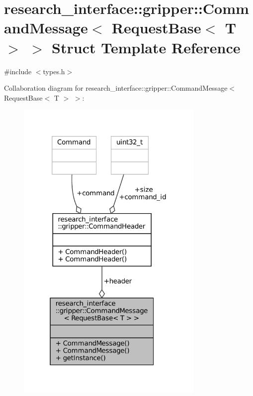 \hypertarget{structresearch__interface_1_1gripper_1_1CommandMessage_3_01RequestBase_3_01T_01_4_01_4}{}\section{research\+\_\+interface\+:\+:gripper\+:\+:Command\+Message$<$ Request\+Base$<$ T $>$ $>$ Struct Template Reference}
\label{structresearch__interface_1_1gripper_1_1CommandMessage_3_01RequestBase_3_01T_01_4_01_4}


{\ttfamily \#include $<$types.\+h$>$}



Collaboration diagram for research\+\_\+interface\+:\+:gripper\+:\+:Command\+Message$<$ Request\+Base$<$ T $>$ $>$\+:
\nopagebreak
\begin{figure}[H]
\begin{center}
\leavevmode
\includegraphics[width=256pt]{structresearch__interface_1_1gripper_1_1CommandMessage_3_01RequestBase_3_01T_01_4_01_4__coll__graph}
\end{center}
\end{figure}

